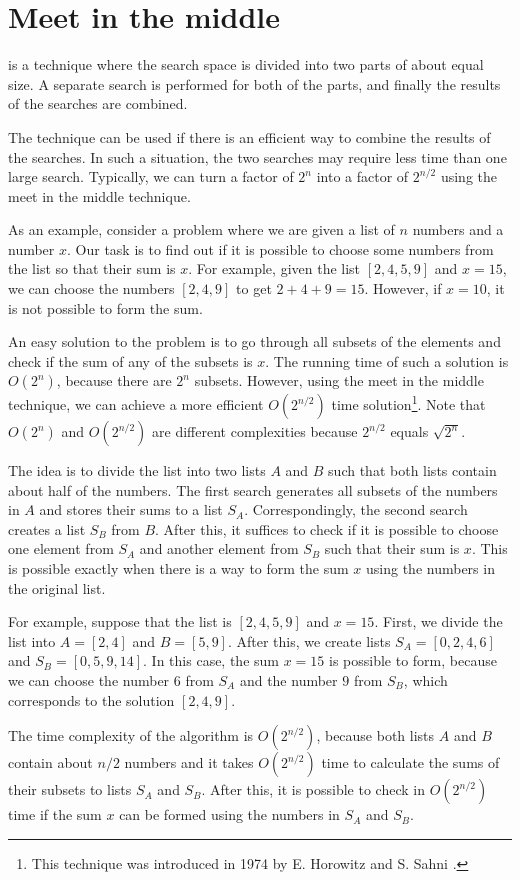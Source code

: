 \section{Meet in the middle}


 is a technique
where the search space is divided into
two parts of about equal size.
A separate search is performed
for both of the parts,
and finally the results of the searches are combined.

The technique can be used
if there is an efficient way to combine the
results of the searches.
In such a situation, the two searches may require less
time than one large search.
Typically, we can turn a factor of $2^n$
into a factor of $2^{n/2}$ using the meet in the
middle technique.

As an example, consider a problem where
we are given a list of $n$ numbers and
a number $x$.
Our task is to find out if it is possible
to choose some numbers from the list so that
their sum is $x$.
For example, given the list $[2,4,5,9]$ and $x=15$,
we can choose the numbers $[2,4,9]$ to get $2+4+9=15$.
However, if $x=10$,
it is not possible to form the sum.

An easy solution to the problem is to
go through all subsets of the elements and
check if the sum of any of the subsets is $x$.
The running time of such a solution is $O(2^n)$,
because there are $2^n$ subsets.
However, using the meet in the middle technique,
we can achieve a more efficient $O(2^{n/2})$ time solution\footnote{This
technique was introduced in 1974 by E. Horowitz and S. Sahni \cite{hor74}.}.
Note that $O(2^n)$ and $O(2^{n/2})$ are different
complexities because $2^{n/2}$ equals $\sqrt{2^n}$.

The idea is to divide the list into
two lists $A$ and $B$ such that both
lists contain about half of the numbers.
The first search generates all subsets
of the numbers in $A$ and stores their sums
to a list $S_A$.
Correspondingly, the second search creates
a list $S_B$ from $B$.
After this, it suffices to check if it is possible
to choose one element from $S_A$ and another
element from $S_B$ such that their sum is $x$.
This is possible exactly when there is a way to
form the sum $x$ using the numbers in the original list.

For example, suppose that the list is $[2,4,5,9]$ and $x=15$.
First, we divide the list into $A=[2,4]$ and $B=[5,9]$.
After this, we create lists
$S_A=[0,2,4,6]$ and $S_B=[0,5,9,14]$.
In this case, the sum $x=15$ is possible to form,
because we can choose the number $6$ from $S_A$
and the number $9$ from $S_B$,
which corresponds to the solution $[2,4,9]$.

The time complexity of the algorithm is $O(2^{n/2})$,
because both lists $A$ and $B$ contain about $n/2$ numbers
and it takes $O(2^{n/2})$ time to calculate the sums of
their subsets to lists $S_A$ and $S_B$.
After this, it is possible to check in 
$O(2^{n/2})$ time if the sum $x$ can be formed
using the numbers in $S_A$ and $S_B$.